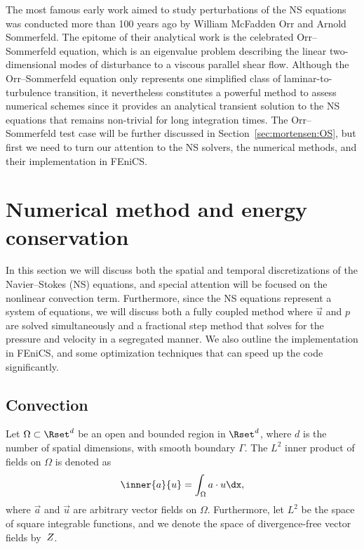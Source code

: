 The most famous early work aimed to study perturbations of the NS
equations was conducted more than 100 years ago by William McFadden
Orr and Arnold Sommerfeld. The epitome of their analytical work
is the celebrated Orr--Sommerfeld equation, which is an eigenvalue
problem describing the linear two-dimensional modes of disturbance to a
viscous parallel shear flow. Although the Orr--Sommerfeld equation only
represents one simplified class of laminar-to-turbulence transition, it
nevertheless constitutes a powerful method to assess numerical schemes
since it provides an analytical transient solution to the NS equations
that remains non-trivial for long integration times. The Orr--Sommerfeld
test case will be further discussed in Section~\ref{sec:mortensen:OS},
but first we need to turn our attention to the NS solvers, the numerical
methods, and their implementation in FEniCS.

\section{Numerical method and energy conservation}
\label{sec:mortensen:Numerical}

In this section we will discuss both the spatial and temporal
discretizations of the Navier--Stokes (NS) equations, and special
attention will be focused on the nonlinear convection
term. Furthermore, since the NS equations represent a system of
equations, we will discuss both a fully coupled method where $\vec{u}$
and $p$ are solved simultaneously and a fractional step method that
solves for the pressure and velocity in a segregated manner. We also
outline the implementation in FEniCS, and some optimization techniques
that can speed up the code significantly.

\subsection{Convection}
\label{sec:mortensen:Convection}

Let $\Omega \subset \Rset^d$ be an open and bounded region in $\Rset^d$,
where $d$ is the number of spatial dimensions, with smooth boundary
$\Gamma$. The $L^2$ inner product of fields on $\Omega$ is denoted as
\begin{equation}
 \inner{\vec{a}}{\vec{u}} = \int_{\Omega} \vec{a}\cdot \vec{u} \dx,
 \label{eq:mortensen:L2}
\end{equation}
where $\vec{a}$ and $\vec{u}$ are arbitrary vector fields on
$\Omega$. Furthermore, let $L^2$ be the space of square integrable
functions, and we denote the space of divergence-free
vector fields by~$Z$.

